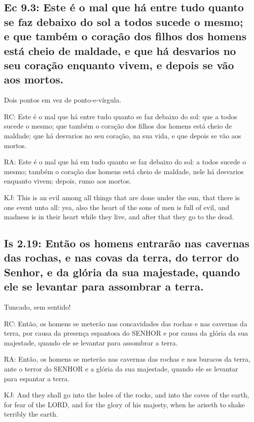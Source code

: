 \subsection{Ec 9.3: Este é o mal que há entre tudo quanto se faz debaixo do sol\uwave{;} a todos sucede o mesmo; e que também o coração dos filhos dos homens está cheio de maldade, e que há desvarios no seu coração enquanto vivem, e depois se vão aos mortos.}

Dois pontos em vez de ponto-e-vírgula.

RC: Este é o mal que há entre tudo quanto se faz debaixo do sol: que a todos sucede o mesmo; que também o coração dos filhos dos homens está cheio de maldade; que há desvarios no seu coração, na sua vida, e que depois se vão aos mortos.

RA: Este é o mal que há em tudo quanto se faz debaixo do sol: a todos sucede o mesmo; também o coração dos homens está cheio de maldade, nele há desvarios enquanto vivem; depois, rumo aos mortos.

KJ: This is an evil among all things that are done under the sun, that there is one event unto all: yea, also the heart of the sons of men is full of evil, and madness is in their heart while they live, and after that they go to the dead.

\subsection{Is 2.19: Então os homens entrarão nas cavernas das rochas, e nas covas da terra, do terror do Senhor, e da glória da sua majestade, quando ele se levantar para assombrar a terra.}
Tuncado, sem sentido!

RC: Então, os homens se meterão nas concavidades das rochas e nas cavernas da terra, por causa da presença espantosa do SENHOR e por causa da glória da sua majestade, quando ele se levantar para assombrar a terra.

RA: Então, os homens se meterão nas cavernas das rochas e nos buracos da terra, ante o terror do SENHOR e a glória da sua majestade, quando ele se levantar para espantar a terra.

KJ: And they shall go into the holes of the rocks, and into the caves of the earth, for fear of the LORD, and for the glory of his majesty, when he ariseth to shake terribly the earth.


